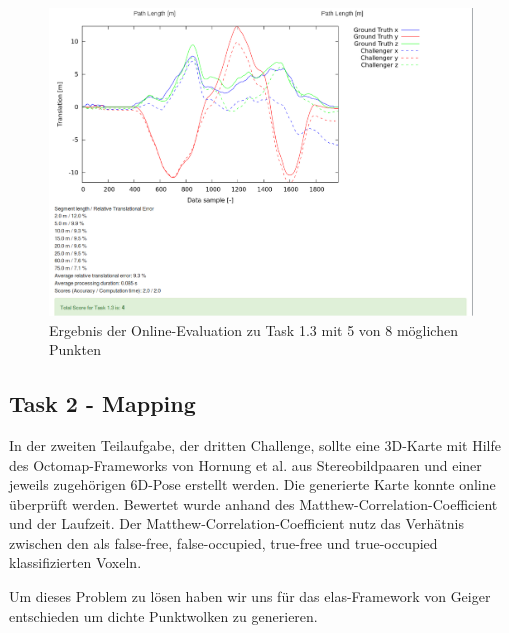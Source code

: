 \documentclass[12pt,titlepage, a4paper]{article}
\begin{document}
\begin{figure}[h!]
 \centering
 \includegraphics[width=\textwidth]{./Screens/t3_checkerboard.png}
 \caption{Ergebnis der Online-Evaluation zu Task 1.3 mit 5 von 8 möglichen Punkten} \label{fig:evat3}
\end{figure}


				
\subsection{Task 2 - Mapping}
In der zweiten Teilaufgabe, der dritten Challenge, sollte eine 3D-Karte mit Hilfe des Octomap-Frameworks von Hornung et al. aus Stereobildpaaren und einer jeweils zugehörigen 6D-Pose erstellt werden. Die generierte Karte konnte online überprüft werden. Bewertet wurde anhand des Matthew-Correlation-Coefficient und der Laufzeit. Der Matthew-Correlation-Coefficient nutz das Verhätnis zwischen den als false-free, false-occupied, true-free und true-occupied klassifizierten Voxeln.

Um dieses Problem zu lösen haben wir uns für das elas-Framework von Geiger entschieden um dichte Punktwolken zu generieren.
\end{document}
